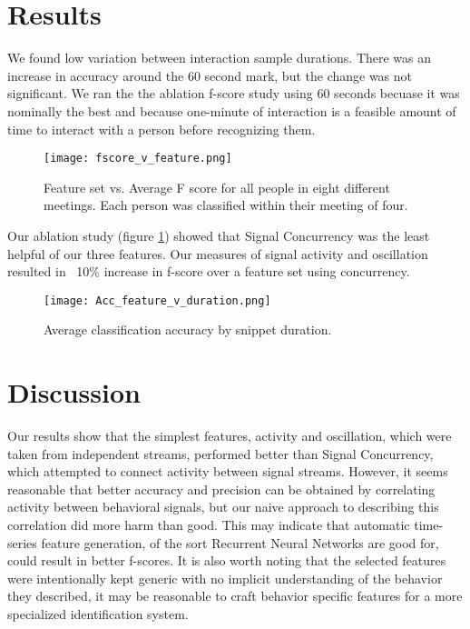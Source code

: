 \documentclass[conference]{IEEEtran}
\begin{document}
\section{Results}

We found low variation between interaction sample durations. There was an increase in accuracy around the 60 second mark, but the change was not significant. We ran the the ablation f-score study using 60 seconds becuase it was nominally the best and because one-minute of interaction is a feasible amount of time to interact with a person before recognizing them.

\begin{figure}[h!]
    \caption{Feature set vs. Average F score for all people in eight different meetings. Each person was classified within their meeting of four.}
    \centering
    \texttt{[image: fscore\_v\_feature.png]}
    \label{fscore}
\end{figure}

Our ablation study (figure \ref{fscore}) showed that Signal Concurrency was the least helpful of our three features. Our measures of signal activity and oscillation resulted in ~10\% increase in f-score over a feature set using concurrency.

\begin{figure}[h]
    \caption{Average classification accuracy by snippet duration.}
    \centering
    \texttt{[image: Acc\_feature\_v\_duration.png]}
    \label{acc_snippet}
\end{figure}

\section{Discussion}

Our results show that the simplest features, activity and oscillation, which were taken from independent streams, performed better than Signal Concurrency, which attempted to connect activity between signal streams. However, it seems reasonable that better accuracy and precision can be obtained by correlating activity between behavioral signals, but our naive approach to describing this correlation did more harm than good. This may indicate that automatic time-series feature generation, of the sort Recurrent Neural Networks are good for, could result in better f-scores. It is also worth noting that the selected features were intentionally kept generic with no implicit understanding of the behavior they described, it may be reasonable to craft behavior specific features for a more specialized identification system. 
\end{document}
